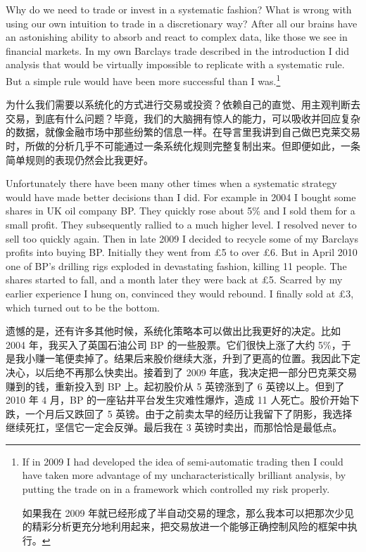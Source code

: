 \begin{englishblock} Why do we need to trade or invest in a systematic fashion? What is wrong with using our own intuition to trade in a discretionary way? After all our brains have an astonishing ability to absorb and react to complex data, like those we see in financial markets. In my own Barclays trade described in the introduction I did analysis that would be virtually impossible to replicate with a systematic rule. But a simple rule would have been more successful than I was.\footnote{If in 2009 I had developed the idea of semi-automatic trading then I could have taken more advantage of my uncharacteristically brilliant analysis, by putting the trade on in a framework which controlled my risk properly. \par 如果我在 2009 年就已经形成了半自动交易的理念，那么我本可以把那次少见的精彩分析更充分地利用起来，把交易放进一个能够正确控制风险的框架中执行。}\end{englishblock}

\begin{chineseblock}为什么我们需要以系统化的方式进行交易或投资？依赖自己的直觉、用主观判断去交易，到底有什么问题？毕竟，我们的大脑拥有惊人的能力，可以吸收并回应复杂的数据，就像金融市场中那些纷繁的信息一样。在导言里我讲到自己做巴克莱交易时，所做的分析几乎不可能通过一条系统化规则完整复制出来。但即便如此，一条简单规则的表现仍然会比我更好。\end{chineseblock}

\bipairgap

\begin{englishblock} Unfortunately there have been many other times when a systematic strategy would have made better decisions than I did. For example in 2004 I bought some shares in UK oil company BP. They quickly rose about 5\% and I sold them for a small profit. They subsequently rallied to a much higher level. I resolved never to sell too quickly again. Then in late 2009 I decided to recycle some of my Barclays profits into buying BP. Initially they went from \pounds 5 to over \pounds 6. But in April 2010 one of BP's drilling rigs exploded in devastating fashion, killing 11 people. The shares started to fall, and a month later they were back at \pounds 5. Scarred by my earlier experience I hung on, convinced they would rebound. I finally sold at \pounds 3, which turned out to be the bottom. \end{englishblock}

\begin{chineseblock}遗憾的是，还有许多其他时候，系统化策略本可以做出比我更好的决定。比如 2004 年，我买入了英国石油公司 BP 的一些股票。它们很快上涨了大约 5\%，于是我小赚一笔便卖掉了。结果后来股价继续大涨，升到了更高的位置。我因此下定决心，以后绝不再那么快卖出。接着到了 2009 年底，我决定把一部分巴克莱交易赚到的钱，重新投入到 BP 上。起初股价从 5 英镑涨到了 6 英镑以上。但到了 2010 年 4 月，BP 的一座钻井平台发生灾难性爆炸，造成 11 人死亡。股价开始下跌，一个月后又跌回了 5 英镑。由于之前卖太早的经历让我留下了阴影，我选择继续死扛，坚信它一定会反弹。最后我在 3 英镑时卖出，而那恰恰是最低点。\end{chineseblock}

